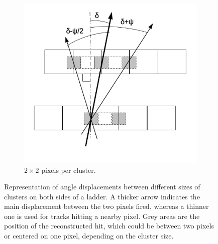 \begin{figure}[!tbh]
      \begin{subfigure}[t]{0.45\textwidth}
        \centering
        \includegraphics[width = \textwidth]{Pictures/deformation/cluster2x2_jerome.png}
        \caption{$2 \times 2$ pixels per cluster.}
        \label{fig:2x2clusters}
      \end{subfigure}
      \caption{Representation of angle displacements between different sizes of clusters on both sides of a ladder. A thicker arrow indicates the main displacement between the two pixels fired, whereas a thinner one is used for tracks hitting a nearby pixel. Grey areas are the position of the reconstructed hit, which could be between two pixels or centered on one pixel, depending on the cluster size.}
      \label{fig:clusterSize}
   \end{figure}




